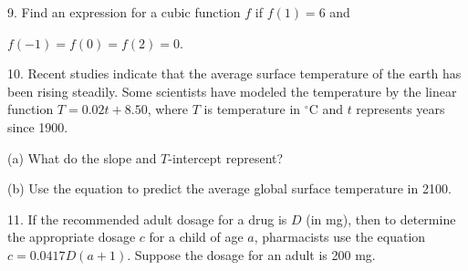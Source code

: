 \documentclass{sebase}
\begin{document}
\begin{multicols}{2}
\begin{ExerciseList}
%

\item[9.] Find an expression for a cubic function $f$ if $f(1)=6$ and

$f(-1)=f(0)=f(2)=0$.

%

%

\item[10.] Recent studies indicate that the average surface temperature of
the earth has been rising steadily. Some scientists have modeled the
temperature by the linear function $T=0.02t+8.50$, where $T$ is temperature
in $^{\circ }\mathrm{C}$ and $t$ represents years since 1900.

\begin{ExerciseList}
\item[(a)] What do the slope and $T$-intercept represent?
\end{ExerciseList}

%

\begin{ExerciseList}
\item[(b)] Use the equation to predict the average global surface
temperature in 2100.
\end{ExerciseList}

%

\item[11.] If the recommended adult dosage for a drug is $D$ (in mg), then
to determine the appropriate dosage $c$ for a child of age $a$, pharmacists
use the equation $c=0.0417D(a+1)$. Suppose the dosage for an adult is 200 mg.


\end{ExerciseList}
\end{multicols}
\end{document}
